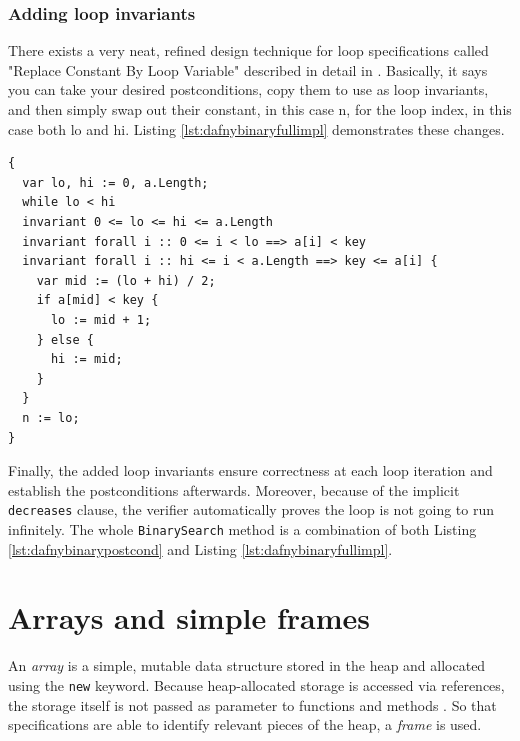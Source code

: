 \documentclass[a4paper]{article}
\begin{document}
\subsubsection{Adding loop invariants}
There exists a very neat, refined design technique
for loop specifications called "Replace Constant By Loop Variable" described in detail in \cite{leino2023program}.
Basically, it says you can take your desired postconditions, copy them to use as loop invariants, and then simply
swap out their constant, in this case n, for the loop index, in this case both lo and hi. Listing
\ref{lst:dafnybinaryfullimpl} demonstrates these changes.
\begin{lstlisting}[style=dafnystyle, caption={Binary search implementation withiout verifier errors.}, label={lst:dafnybinaryfullimpl}]
{
  var lo, hi := 0, a.Length;
  while lo < hi
  invariant 0 <= lo <= hi <= a.Length
  invariant forall i :: 0 <= i < lo ==> a[i] < key
  invariant forall i :: hi <= i < a.Length ==> key <= a[i] {
    var mid := (lo + hi) / 2;
    if a[mid] < key {
      lo := mid + 1;
    } else {
      hi := mid;
    }
  }
  n := lo;
}
\end{lstlisting}
Finally, the added loop invariants ensure correctness at each loop iteration and establish the postconditions
afterwards. Moreover, because of the implicit \texttt{decreases} clause, the verifier automatically proves
the loop is not going to run infinitely. The whole \texttt{BinarySearch} method is a combination of
both Listing \ref{lst:dafnybinarypostcond} and Listing \ref{lst:dafnybinaryfullimpl}.

\section{Arrays and simple frames}
An \textit{array} is a simple, mutable data structure stored in the heap and allocated using the \texttt{new} keyword.
Because heap-allocated storage is accessed via references, the storage itself is not passed as parameter to functions
and methods \cite{leino2023program}. So that specifications are able to identify relevant pieces of the heap, a
\textit{frame} is used.
\end{document}
